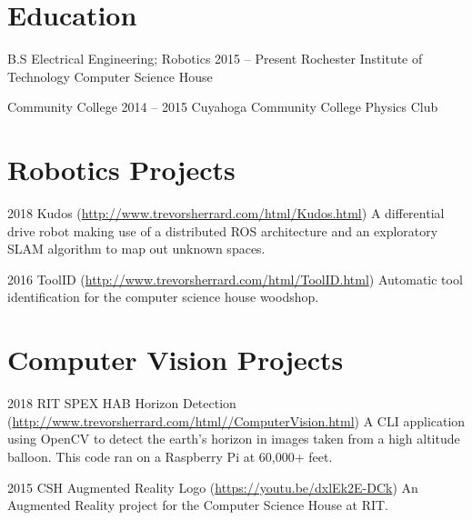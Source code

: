 \documentclass{tccv}
\begin{document}
\section{Education}

\begin{yearlist}

\item[B.S Electrical Engineering; Robotics]{2015 -- Present}
     {Rochester Institute of Technology}
     {Computer Science House}
     
\item[Community College]{2014 -- 2015}
     {Cuyahoga Community College}
     {Physics Club}
     
\end{yearlist}


\section{Robotics Projects}

\begin{yearlist}

\item{2018}
     {Kudos (\href{http://www.trevorsherrard.com/html/Kudos.html}{http://www.trevorsherrard.com\newline/html/Kudos.html})}
     {A differential drive robot making use of a distributed ROS architecture and an exploratory SLAM algorithm to map out unknown spaces.}

\item{2016}
     {ToolID (\href{http://www.trevorsherrard.com/html/ToolID.html}
     {http://www.trevorsherrard.com\newline/html/ToolID.html})}
     {Automatic tool identification for the computer science house woodshop. }
     
\end{yearlist}


\section{Computer Vision Projects}

\begin{yearlist}

\item{2018}
     {RIT SPEX HAB Horizon Detection (\href{http://www.trevorsherrard.com/html/ComputerVision.html}{http://www.trevorsherrard.com/html/\newline/ComputerVision.html})}
     {A CLI application using OpenCV to detect the earth's horizon in images taken from a high altitude balloon. This code ran on a Raspberry Pi at 60,000+ feet.}
    
\item{2015}
     {CSH Augmented Reality Logo (\href{https://youtu.be/dxlEk2E-DCk}{https://youtu.be/dxlEk2E-DCk})}
     {An Augmented Reality project for the Computer Science House at RIT.}

\end{yearlist}
\end{document}
